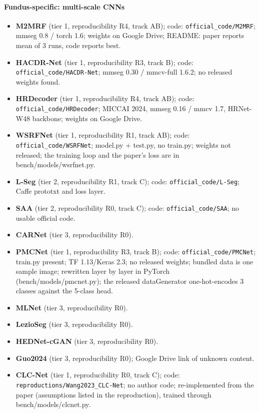 \paragraph{Fundus-specific: multi-scale CNNs}
\begin{itemize}[leftmargin=*,itemsep=1pt]
\item \textbf{M2MRF} (tier 1, reproducibility R4, track AB); code: \texttt{official\_code/M2MRF}; mmseg 0.8 / torch 1.6; weights on Google Drive; README: paper reports mean of 3 runs, code reports best.
\item \textbf{HACDR-Net} (tier 1, reproducibility R3, track B); code: \texttt{official\_code/HACDR-Net}; mmseg 0.30 / mmcv-full 1.6.2; no released weights found.
\item \textbf{HRDecoder} (tier 1, reproducibility R4, track AB); code: \texttt{official\_code/HRDecoder}; MICCAI 2024, mmseg 0.16 / mmcv 1.7, HRNet-W48 backbone; weights on Google Drive.
\item \textbf{WSRFNet} (tier 1, reproducibility R1, track AB); code: \texttt{official\_code/WSRFNet}; model.py + test.py, no train.py; weights not released; the training loop and the paper's loss are in bench/models/wsrfnet.py.
\item \textbf{L-Seg} (tier 2, reproducibility R1, track C); code: \texttt{official\_code/L-Seg}; Caffe prototxt and loss layer.
\item \textbf{SAA} (tier 2, reproducibility R0, track C); code: \texttt{official\_code/SAA}; no usable official code.
\item \textbf{CARNet} (tier 3, reproducibility R0).
\item \textbf{PMCNet} (tier 1, reproducibility R3, track B); code: \texttt{official\_code/PMCNet}; train.py present; TF 1.13/Keras 2.3; no released weights; bundled data is one sample image; rewritten layer by layer in PyTorch (bench/models/pmcnet.py); the released dataGenerator one-hot-encodes 3 classes against the 5-class head.
\item \textbf{MLNet} (tier 3, reproducibility R0).
\item \textbf{LezioSeg} (tier 3, reproducibility R0).
\item \textbf{HEDNet-cGAN} (tier 3, reproducibility R0).
\item \textbf{Guo2024} (tier 3, reproducibility R0); Google Drive link of unknown content.
\item \textbf{CLC-Net} (tier 1, reproducibility R0, track C); code: \texttt{reproductions/Wang2023\_CLC-Net}; no author code; re-implemented from the paper (assumptions listed in the reproduction), trained through bench/models/clcnet.py.
\end{itemize}
